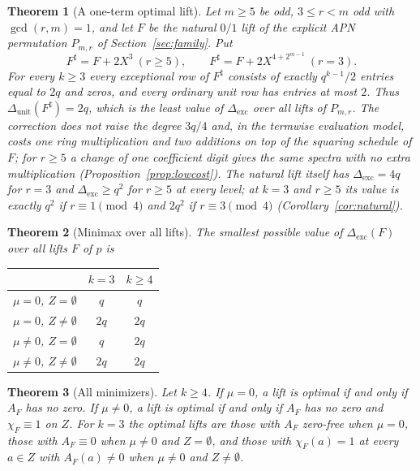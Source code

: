 \documentclass[11pt]{article}
\newtheorem{maintheorem}{Theorem}
\theoremstyle{definition}
\theoremstyle{remark}
\newcommand{\Dexc}{\Delta_{\mathrm{exc}}}
\newcommand{\Dunit}{\Delta_{\mathrm{unit}}}
\begin{document}
\begin{maintheorem}[A one-term optimal lift]\label{thm:oneterm}
Let $m\ge5$ be odd, $3\le r<m$ odd with $\gcd(r,m)=1$, and let $F$ be the natural $0/1$ lift of the explicit APN
permutation $P_{m,r}$ of Section~\ref{sec:family}. Put
\[
  F^\sharp=F+2X^3\ (r\ge5),\qquad F^\sharp=F+2X^{4+2^{m-1}}\ (r=3).
\]
For every $k\ge3$ every exceptional row of $F^\sharp$ consists of exactly $q^{k-1}/2$ entries equal to $2q$
and zeros, and every ordinary unit row has entries at most $2$. Thus $\Dunit(F^\sharp)=2q$, which is the least
value of $\Dexc$ over all lifts of $P_{m,r}$. The correction does not raise the degree $3q/4$ and, in the termwise evaluation model, costs one ring
multiplication and two additions on top of the squaring schedule of $F$; for $r\ge5$ a change of one coefficient
digit gives the same spectra with no extra multiplication (Proposition~\ref{prop:lowcost}). The natural lift itself has
$\Dexc=4q$ for $r=3$ and $\Dexc\ge q^2$ for $r\ge5$ at every level; at $k=3$ and $r\ge5$ its value is exactly $q^2$ if
$r\equiv1\pmod4$ and $2q^2$ if $r\equiv3\pmod4$ (Corollary~\ref{cor:natural}).
\end{maintheorem}

\begin{maintheorem}[Minimax over all lifts]\label{thm:minimax}
The smallest possible value of $\Dexc(F)$ over all lifts $F$ of $p$ is
\begin{center}
\begin{tabular}{lcc}
\toprule
 & $k=3$ & $k\ge 4$\\ \midrule
 $\mu=0$, $Z=\emptyset$ & $q$ & $q$\\
 $\mu=0$, $Z\neq\emptyset$ & $2q$ & $2q$\\
 $\mu\neq0$, $Z=\emptyset$ & $q$ & $2q$\\
 $\mu\neq0$, $Z\neq\emptyset$ & $2q$ & $2q$\\ \bottomrule
\end{tabular}
\end{center}
\end{maintheorem}

\begin{maintheorem}[All minimizers]\label{thm:minimizers}
Let $k\ge4$. If $\mu=0$, a lift is optimal if and only if $A_F$ has no zero.
If $\mu\neq0$, a lift is optimal if and only if $A_F$ has no zero and $\chi_F\equiv1$ on $Z$.
For $k=3$ the optimal lifts are those with $A_F$ zero-free when $\mu=0$,
those with $A_F\equiv0$ when $\mu\neq0$ and $Z=\emptyset$,
and those with $\chi_F(a)=1$ at every $a\in Z$ with $A_F(a)\neq0$ when $\mu\neq0$ and $Z\neq\emptyset$.
\end{maintheorem}
\end{document}

